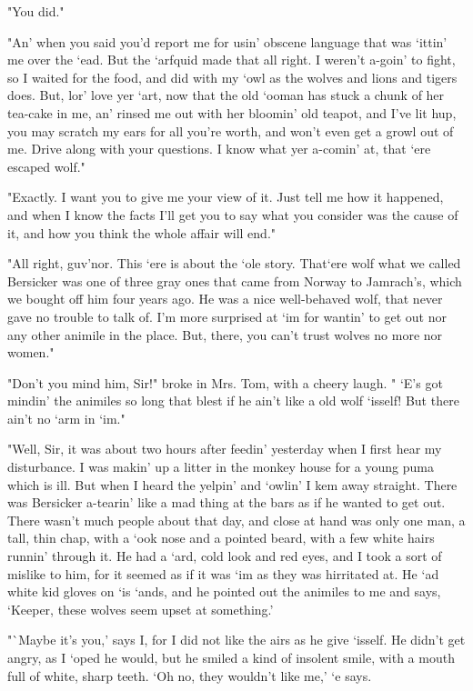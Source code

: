 "You did." 

"An' when you said you'd report me for usin' obscene language that was `ittin' me over the `ead. But the `arfquid made that all right. I weren't a-goin' to fight, so I waited for the food, and did with my `owl as the wolves and lions and tigers does. But, lor' love yer `art, now that the old `ooman has stuck a chunk of her tea-cake in me, an' rinsed me out with her bloomin' old teapot, and I've lit hup, you may scratch my ears for all you're worth, and won't even get a growl out of me. Drive along with your questions. I know what yer a-comin' at, that `ere escaped wolf." 

"Exactly. I want you to give me your view of it. Just tell me how it happened, and when I know the facts I'll get you to say what you consider was the cause of it, and how you think the whole affair will end." 

"All right, guv'nor. This `ere is about the `ole story. That`ere wolf what we called Bersicker was one of three gray ones that came from Norway to Jamrach's, which we bought off him four years ago. He was a nice well-behaved wolf, that never gave no trouble to talk of. I'm more surprised at `im for wantin' to get out nor any other animile in the place. But, there, you can't trust wolves no more nor women." 

"Don't you mind him, Sir!" broke in Mrs. Tom, with a cheery laugh. " `E's got mindin' the animiles so long that blest if he ain't like a old wolf `isself! But there ain't no `arm in `im." 

"Well, Sir, it was about two hours after feedin' yesterday when I first hear my disturbance. I was makin' up a litter in the monkey house for a young puma which is ill. But when I heard the yelpin' and `owlin' I kem away straight. There was Bersicker a-tearin' like a mad thing at the bars as if he wanted to get out. There wasn't much people about that day, and close at hand was only one man, a tall, thin chap, with a `ook nose and a pointed beard, with a few white hairs runnin' through it. He had a `ard, cold look and red eyes, and I took a sort of mislike to him, for it seemed as if it was `im as they was hirritated at. He `ad white kid gloves on `is `ands, and he pointed out the animiles to me and says, `Keeper, these wolves seem upset at something.' 

"`Maybe it's you,' says I, for I did not like the airs as he give `isself. He didn't get angry, as I `oped he would, but he smiled a kind of insolent smile, with a mouth full of white, sharp teeth. `Oh no, they wouldn't like me,' `e says. 

